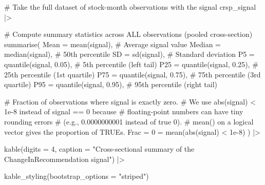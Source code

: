 \documentclass[
  letterpaper,
  DIV=11,
  numbers=noendperiod]{scrartcl}
\newenvironment{Shaded}{\begin{snugshade}}{\end{snugshade}}
\newcommand{\AttributeTok}[1]{\textcolor[rgb]{0.40,0.45,0.13}{#1}}
\newcommand{\CommentTok}[1]{\textcolor[rgb]{0.37,0.37,0.37}{#1}}
\newcommand{\DecValTok}[1]{\textcolor[rgb]{0.68,0.00,0.00}{#1}}
\newcommand{\FloatTok}[1]{\textcolor[rgb]{0.68,0.00,0.00}{#1}}
\newcommand{\FunctionTok}[1]{\textcolor[rgb]{0.28,0.35,0.67}{#1}}
\newcommand{\NormalTok}[1]{\textcolor[rgb]{0.00,0.23,0.31}{#1}}
\newcommand{\OtherTok}[1]{\textcolor[rgb]{0.00,0.23,0.31}{#1}}
\newcommand{\SpecialCharTok}[1]{\textcolor[rgb]{0.37,0.37,0.37}{#1}}
\newcommand{\StringTok}[1]{\textcolor[rgb]{0.13,0.47,0.30}{#1}}
\begin{document}
\begin{Shaded}
\begin{Highlighting}[]
\CommentTok{\# Take the full dataset of stock{-}month observations with the signal}
\NormalTok{crsp\_signal }\SpecialCharTok{|\textgreater{}}

  \CommentTok{\# Compute summary statistics across ALL observations (pooled cross{-}section)}
  \FunctionTok{summarise}\NormalTok{(}
    \AttributeTok{Mean   =} \FunctionTok{mean}\NormalTok{(signal),            }\CommentTok{\# Average signal value}
    \AttributeTok{Median =} \FunctionTok{median}\NormalTok{(signal),          }\CommentTok{\# 50th percentile}
    \AttributeTok{SD     =} \FunctionTok{sd}\NormalTok{(signal),              }\CommentTok{\# Standard deviation}
    \AttributeTok{P5     =} \FunctionTok{quantile}\NormalTok{(signal, }\FloatTok{0.05}\NormalTok{),  }\CommentTok{\# 5th percentile (left tail)}
    \AttributeTok{P25    =} \FunctionTok{quantile}\NormalTok{(signal, }\FloatTok{0.25}\NormalTok{),  }\CommentTok{\# 25th percentile (1st quartile)}
    \AttributeTok{P75    =} \FunctionTok{quantile}\NormalTok{(signal, }\FloatTok{0.75}\NormalTok{),  }\CommentTok{\# 75th percentile (3rd quartile)}
    \AttributeTok{P95    =} \FunctionTok{quantile}\NormalTok{(signal, }\FloatTok{0.95}\NormalTok{),  }\CommentTok{\# 95th percentile (right tail)}

    \CommentTok{\# Fraction of observations where signal is exactly zero.}
    \CommentTok{\# We use abs(signal) \textless{} 1e{-}8 instead of signal == 0 because}
    \CommentTok{\# floating{-}point numbers can have tiny rounding errors}
    \CommentTok{\# (e.g., 0.0000000001 instead of true 0).}
    \CommentTok{\# mean() on a logical vector gives the proportion of TRUEs.}
    \StringTok{\textasciigrave{}}\AttributeTok{Frac = 0}\StringTok{\textasciigrave{}} \OtherTok{=} \FunctionTok{mean}\NormalTok{(}\FunctionTok{abs}\NormalTok{(signal) }\SpecialCharTok{\textless{}} \FloatTok{1e{-}8}\NormalTok{)}
\NormalTok{  ) }\SpecialCharTok{|\textgreater{}}

  \FunctionTok{kable}\NormalTok{(}\AttributeTok{digits =} \DecValTok{4}\NormalTok{, }
        \AttributeTok{caption =} \StringTok{"Cross{-}sectional summary of the ChangeInRecommendation signal"}\NormalTok{) }\SpecialCharTok{|\textgreater{}}

  \FunctionTok{kable\_styling}\NormalTok{(}\AttributeTok{bootstrap\_options =} \StringTok{"striped"}\NormalTok{)}
\end{Highlighting}
\end{Shaded}
\end{document}
